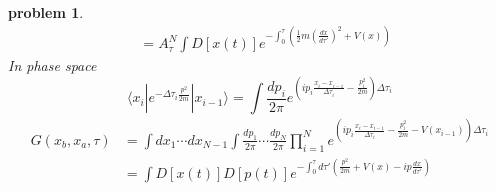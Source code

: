 \documentclass[a4paper,11pt]{article}
\newtheorem{problem}{problem}[subsection]
\begin{document}
\begin{problem}
\begin{equation*}
\begin{split}
         &=A_{\tau}^{N}\int D[x(t)]e^{-\int_{0}^{\tau}(\frac{1}{2}m(\frac{dx}{d\tau'})^2+V(x))}
    \end{split}
  \end{equation*}
  In phase space
  \begin{equation*}
    \langle x_i|e^{-\Delta\tau_i\frac{p^2}{2m}}|x_{i-1}\rangle=\int\frac{dp_i}{2\pi}e^{(ip_i\frac{x_i-x_{i-1}}{\Delta\tau_i}-\frac{p_i^2}{2m})\Delta\tau_i}
  \end{equation*}
  \begin{equation*}
    \begin{split}
       G(x_b,x_a,\tau)&=\int dx_1\cdots dx_{N-1}\int\frac{dp_1}{2\pi}\cdots\frac{dp_N}{2\pi}\prod_{i=1}^{N}e^{(ip_i\frac{x_i-x_{i-1}}{\Delta\tau_i}-\frac{p_i^2}{2m}-V(x_{i-1}))\Delta\tau_i}\\
         &=\int D[x(t)]D[p(t)]e^{-\int_{0}^{\tau}d\tau'(\frac{p^2}{2m}+V(x)-ip\frac{dx}{d\tau'})}
    \end{split}
  \end{equation*}
\end{problem}
\end{document}
